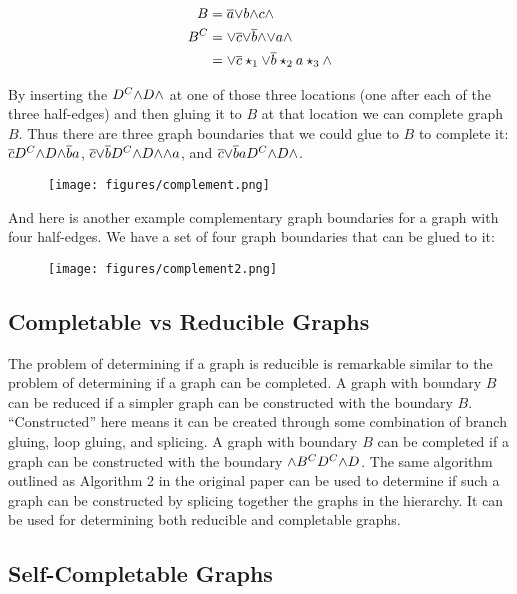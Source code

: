 \documentclass[acmtog]{acmart}
\begin{document}
\begin{equation}
\begin{split}
B    & = \overline{a} {\vee} b {\wedge} c {\wedge} \\
B^C  & = {\vee} \overline{c} {\vee} \overline{b} {\wedge} {\vee} a {\wedge} \\
     & = {\vee} \overline{c} \star_1 {\vee} \overline{b} \star_2 a \star_3 {\wedge} \\
\end{split}
\end{equation}

By inserting the $D^C {\wedge} D {\wedge}$ at one of those three locations (one after each of
the three half-edges) and then gluing it to $B$ at that location we can complete
graph $B$. Thus there are three graph boundaries that we could glue to $B$ to
complete it: $\overline{c} D^C {\wedge} D {\wedge} \overline{b} a$,
$\overline{c} {\vee} \overline{b} D^C {\wedge} D {\wedge} {\wedge} a$, and
$\overline{c} {\vee} \overline{b} a D^C {\wedge} D {\wedge}$.

\begin{figure}[H]
\centering
\texttt{[image: figures/complement.png]}
\end{figure}

And here is another example complementary graph boundaries for a graph with
four half-edges. We have a set of four graph boundaries that can be glued to it:

\begin{figure}[H]
\centering
\texttt{[image: figures/complement2.png]}
\end{figure}

\subsection{Completable vs Reducible Graphs}

The problem of determining if a graph is reducible is remarkable similar to the
problem of determining if a graph can be completed. A graph with boundary
$B$ can be reduced if a simpler graph can be constructed with the boundary $B$.
``Constructed'' here means it can be created through some combination of branch
gluing, loop gluing, and splicing. A graph with boundary $B$ can be completed if
a graph can be constructed with the boundary ${\wedge} B^C D^C {\wedge} D$. The same algorithm
outlined as Algorithm 2 in the original paper can be used to determine if such
a graph can be constructed by splicing together the graphs in the hierarchy. It
can be used for determining both reducible and completable graphs.

\subsection{Self-Completable Graphs}
\end{document}
